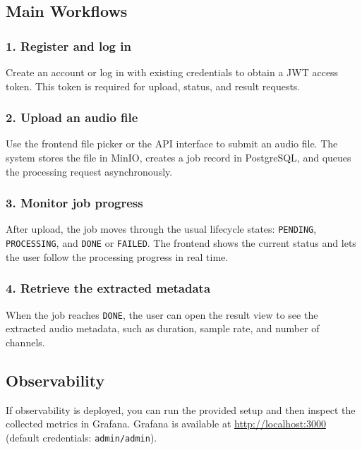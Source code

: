 \documentclass{scrartcl}
\begin{document}
\subsection*{Main Workflows}

\subsubsection*{1. Register and log in}

Create an account or log in with existing credentials to obtain a JWT access token.
This token is required for upload, status, and result requests.

\subsubsection*{2. Upload an audio file}

Use the frontend file picker or the API interface to submit an audio file.
The system stores the file in MinIO, creates a job record in PostgreSQL, and queues the processing request asynchronously.

\subsubsection*{3. Monitor job progress}

After upload, the job moves through the usual lifecycle states: \texttt{PENDING}, \texttt{PROCESSING}, and \texttt{DONE} or \texttt{FAILED}.
The frontend shows the current status and lets the user follow the processing progress in real time.

\subsubsection*{4. Retrieve the extracted metadata}

When the job reaches \texttt{DONE}, the user can open the result view to see the extracted audio metadata, such as duration, sample rate, and number of channels.

\subsection*{Observability}

If observability is deployed, you can run the provided setup and then inspect the collected metrics in Grafana.
Grafana is available at \url{http://localhost:3000} (default credentials: \texttt{admin/admin}).
\end{document}
